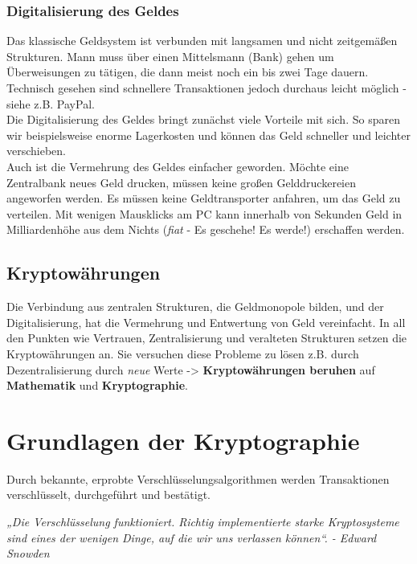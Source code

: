 \documentclass[10pt,a4paper,titlepage]{article}
\begin{document}
\subsubsection{Digitalisierung des Geldes}
Das klassische Geldsystem ist verbunden mit langsamen und nicht zeitgemäßen Strukturen. Mann muss über einen Mittelsmann (Bank) gehen um Überweisungen zu tätigen,  die dann meist noch ein bis zwei Tage dauern.\\Technisch gesehen sind schnellere Transaktionen jedoch durchaus leicht möglich - siehe z.B. PayPal.\\
Die Digitalisierung des Geldes bringt zunächst viele Vorteile mit sich. So sparen wir beispielsweise enorme Lagerkosten und können das Geld schneller und leichter verschieben.\\
Auch ist die Vermehrung des Geldes einfacher geworden. Möchte eine Zentralbank neues Geld drucken, müssen keine großen Gelddruckereien angeworfen werden. Es müssen keine Geldtransporter anfahren, um das Geld zu verteilen. Mit wenigen Mausklicks am PC kann innerhalb von Sekunden Geld in Milliardenhöhe aus dem Nichts (\textit{fiat} - Es geschehe! Es werde!) erschaffen werden.  

\subsection{Kryptowährungen}
Die Verbindung aus zentralen Strukturen, die Geldmonopole bilden, und der Digitalisierung, hat die Vermehrung und Entwertung von Geld vereinfacht.
In all den Punkten wie Vertrauen, Zentralisierung und veralteten Strukturen setzen die Kryptowährungen an. Sie versuchen diese Probleme zu lösen z.B. durch Dezentralisierung durch \textit{neue} Werte -> \textbf{Kryptowährungen beruhen} auf \textbf{Mathematik} und \textbf{Kryptographie}.

\section{Grundlagen der Kryptographie}
Durch bekannte, erprobte Verschlüsselungsalgorithmen werden Transaktionen
verschlüsselt, durchgeführt und bestätigt.
\begin{center}
\textit{„Die Verschlüsselung funktioniert. Richtig implementierte starke
Kryptosysteme sind eines der wenigen Dinge, auf die wir uns verlassen können“. - Edward Snowden}
\end{center}
\end{document}
